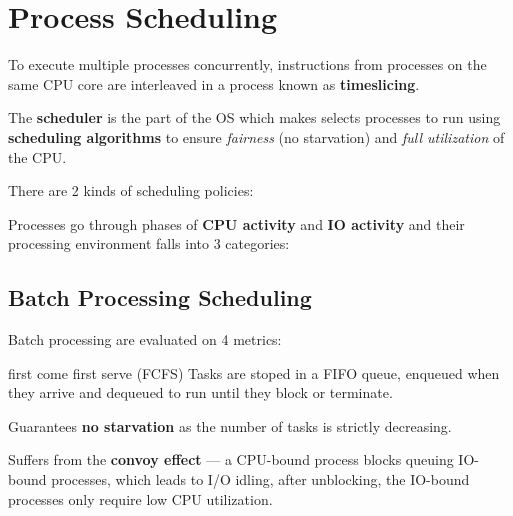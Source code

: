 \section{Process Scheduling}
To execute multiple processes concurrently, instructions from processes on the same CPU core are interleaved
in a process known as \textbf{timeslicing}.

The \textbf{scheduler} is the part of the OS which makes selects processes to run using \textbf{scheduling algorithms} to ensure \textit{fairness} (no starvation) and \textit{full utilization} of the CPU.

There are 2 kinds of scheduling policies:
\begin{enumerate}
\end{enumerate}

Processes go through phases of \textbf{CPU activity} and \textbf{IO activity} and their processing environment falls into 3 categories:
\begin{enumerate}
\end{enumerate}

\subsection{Batch Processing Scheduling}
Batch processing are evaluated on 4 metrics:
\begin{itemize}
\end{itemize}

\begin{defn}{first come first serve (FCFS)}
    Tasks are stoped in a FIFO queue, enqueued when they arrive and dequeued to run until they block or terminate.

    Guarantees \textbf{no starvation} as the number of tasks is strictly decreasing.

    Suffers from the \textbf{convoy effect} --- a CPU-bound process blocks queuing IO-bound processes, which leads to I/O idling, after unblocking, the IO-bound processes only require low CPU utilization.
\end{defn}

